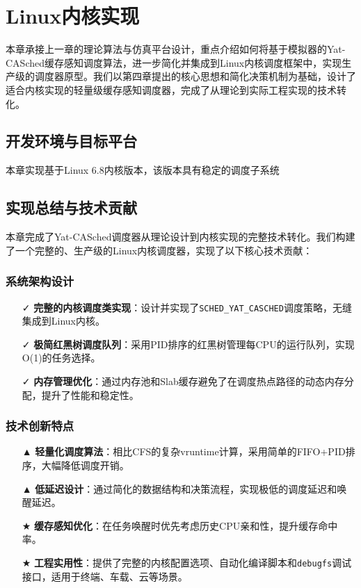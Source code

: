
\newpage
\section{Linux内核实现} \label{sec:kernel}

本章承接上一章的理论算法与仿真平台设计，重点介绍如何将基于模拟器的Yat-CASched缓存感知调度算法，进一步简化并集成到Linux内核调度框架中，实现生产级的调度器原型。我们以第四章提出的核心思想和简化决策机制为基础，设计了适合内核实现的轻量级缓存感知调度器，完成了从理论到实际工程实现的技术转化。

\subsection{开发环境与目标平台}

本章实现基于Linux 6.8内核版本，该版本具有稳定的调度子系统\subsection{实现总结与技术贡献}

本章完成了Yat-CASched调度器从理论设计到内核实现的完整技术转化。我们构建了一个完整的、生产级的Linux内核调度器，实现了以下核心技术贡献：

\subsubsection{系统架构设计}
\begin{itemize}
    \item[✓] \textbf{完整的内核调度类实现}：设计并实现了\texttt{SCHED\_YAT\_CASCHED}调度策略，无缝集成到Linux内核。
    \item[✓] \textbf{极简红黑树调度队列}：采用PID排序的红黑树管理每CPU的运行队列，实现O(1)的任务选择。
    \item[✓] \textbf{内存管理优化}：通过内存池和Slab缓存避免了在调度热点路径的动态内存分配，提升了性能和稳定性。
\end{itemize}

\subsubsection{技术创新特点}
\begin{itemize}
    \item[▲] \textbf{轻量化调度算法}：相比CFS的复杂vruntime计算，采用简单的FIFO+PID排序，大幅降低调度开销。
    \item[▲] \textbf{低延迟设计}：通过简化的数据结构和决策流程，实现极低的调度延迟和唤醒延迟。
    \item[★] \textbf{缓存感知优化}：在任务唤醒时优先考虑历史CPU亲和性，提升缓存命中率。
    \item[★] \textbf{工程实用性}：提供了完整的内核配置选项、自动化编译脚本和\texttt{debugfs}调试接口，适用于终端、车载、云等场景。
\end{itemize}

